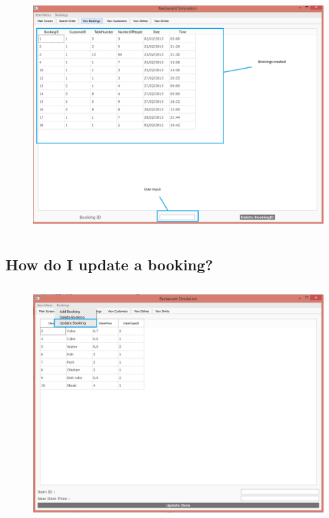 \begin{figure}[H]
    \includegraphics[height = 9cm]{./Manual/images/DeleteBooking2} 
    \caption{} \label{fig:deletebooking2}
\end{figure}

\subsection{How do I update a booking?}

\begin{figure}[H]
    \includegraphics[height = 9cm]{./Manual/images/UpdateBooking1} 
    \caption{} \label{fig:updatebooking1}
\end{figure}

